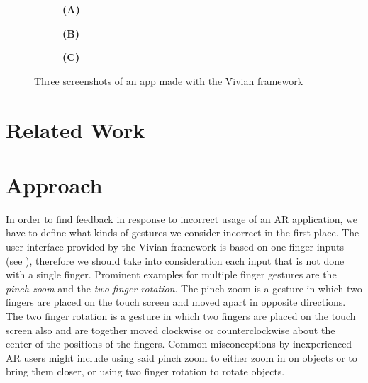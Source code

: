 \documentclass[11pt, a4paper]{article}
\begin{document}
\begin{figure}[H]
			\begin{subfigure}[t]{.32\textwidth}\centering
				\textbf{(A)}
			\end{subfigure}
			\begin{subfigure}[t]{.32\textwidth}\centering
				\textbf{(B)}
			\end{subfigure}
			\begin{subfigure}[t]{.32\textwidth}\centering
				\textbf{(C)}
			\end{subfigure}
			\caption{Three screenshots of an app made with the Vivian framework}
			\label{fig:feedbackonphone}
		\end{figure}

	\section*{Related Work}\label{sec:relatedwork}


	\section*{Approach}\label{sec:approach}
		In order to find feedback in response to incorrect usage of an \ac{AR} application, we have to define what kinds of gestures we consider incorrect in the first place. The user interface provided by the Vivian framework is based on one finger inputs (see ), therefore we should take into consideration each input that is not done with a single finger. Prominent examples for multiple finger gestures are the \emph{pinch zoom} and the \emph{two finger rotation}. The pinch zoom is a gesture in which two fingers are placed on the touch screen and moved apart in opposite directions. The two finger rotation is a gesture in which two fingers are placed on the touch screen also and are together moved clockwise or counterclockwise about the center of the positions of the fingers. Common misconceptions by inexperienced \ac{AR} users might include using said pinch zoom to either zoom in on objects or to bring them closer, or using two finger rotation to rotate objects.
\end{document}
